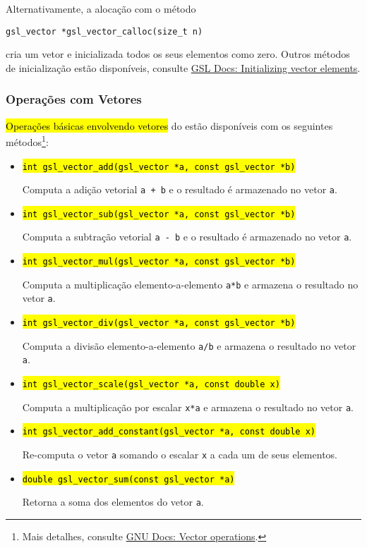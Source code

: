 \documentclass[12pt]{article}
\begin{document}
\begin{obs}
  Alternativamente, a alocação com o método
\begin{lstlisting}
gsl_vector *gsl_vector_calloc(size_t n)
\end{lstlisting}
  cria um vetor e inicializada todos os seus elementos como zero. Outros métodos de inicialização estão disponíveis, consulte \href{https://www.gnu.org/software/gsl/doc/html/vectors.html#initializing-vector-elements}{GSL Docs: Initializing vector elements}.
\end{obs}

\subsubsection{Operações com Vetores}

\hl{Operações básicas envolvendo vetores} do {\gsl} estão disponíveis com os seguintes métodos\footnote{Mais detalhes, consulte \href{https://www.gnu.org/software/gsl/doc/html/vectors.html\#vector-operations}{GNU Docs: Vector operations}.}:
\begin{itemize}
\item \hl{\texttt{int gsl\_vector\_add(gsl\_vector *a, const gsl\_vector *b)}}

  Computa a adição vetorial \lstinline!a + b! e o resultado é armazenado no vetor \lstinline+a+.

\item \hl{\texttt{int gsl\_vector\_sub(gsl\_vector *a, const gsl\_vector *b)}}

  Computa a subtração vetorial \lstinline!a - b! e o resultado é armazenado no vetor \lstinline!a!.

\item \hl{\texttt{int gsl\_vector\_mul(gsl\_vector *a, const gsl\_vector *b)}}

  Computa a multiplicação elemento-a-elemento \lstinline!a*b! e armazena o resultado no vetor \lstinline!a!.

\item \hl{\texttt{int gsl\_vector\_div(gsl\_vector *a, const gsl\_vector *b)}}

  Computa a divisão elemento-a-elemento \lstinline!a/b! e armazena o resultado no vetor \lstinline!a!.

\item \hl{\texttt{int gsl\_vector\_scale(gsl\_vector *a, const double x)}}

  Computa a multiplicação por escalar \lstinline!x*a! e armazena o resultado no vetor \lstinline!a!.

\item \hl{\texttt{int gsl\_vector\_add\_constant(gsl\_vector *a, const double x)}}

  Re-computa o vetor \lstinline!a! somando o escalar \lstinline!x! a cada um de seus elementos.

\item \hl{\texttt{double gsl\_vector\_sum(const gsl\_vector *a)}}

  Retorna a soma dos elementos do vetor \lstinline!a!.
\end{itemize}
\end{document}
